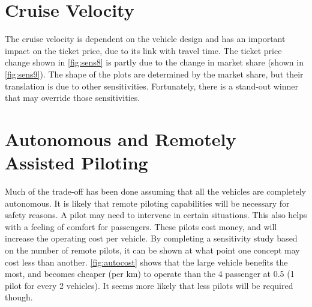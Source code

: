 \section{Cruise Velocity}
The cruise velocity is dependent on the vehicle design and has an important impact on the ticket price, due to its link with travel time. The ticket price change shown in \autoref{fig:sens8} is partly due to the change in market share (shown in \autoref{fig:sens9}). The shape of the plots are determined by the market share, but their translation is due to other sensitivities. Fortunately, there is a stand-out winner that may override those sensitivities.

\section{Autonomous and Remotely Assisted Piloting}
Much of the trade-off has been done assuming that all the vehicles are completely autonomous. It is likely that remote piloting capabilities will be necessary for safety reasons. A pilot may need to intervene in certain situations. This also helps with a feeling of comfort for passengers. These pilots cost money, and will increase the operating cost per vehicle. By completing a sensitivity study based on the number of remote pilots, it can be shown at what point one concept may cost less than another. \autoref{fig:autocost} shows that the large vehicle benefits the most, and becomes cheaper (per km) to operate than the 4 passenger at 0.5 (1 pilot for every 2 vehicles). It seems more likely that less pilots will be required though.

